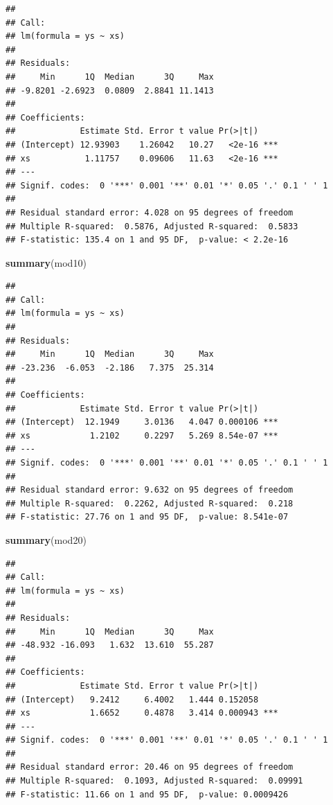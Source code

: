 \documentclass[
]{book}
\newenvironment{Shaded}{\begin{snugshade}}{\end{snugshade}}
\newcommand{\FunctionTok}[1]{\textcolor[rgb]{0.13,0.29,0.53}{\textbf{#1}}}
\newcommand{\NormalTok}[1]{#1}
\begin{document}
\begin{verbatim}
## 
## Call:
## lm(formula = ys ~ xs)
## 
## Residuals:
##     Min      1Q  Median      3Q     Max 
## -9.8201 -2.6923  0.0809  2.8841 11.1413 
## 
## Coefficients:
##             Estimate Std. Error t value Pr(>|t|)    
## (Intercept) 12.93903    1.26042   10.27   <2e-16 ***
## xs           1.11757    0.09606   11.63   <2e-16 ***
## ---
## Signif. codes:  0 '***' 0.001 '**' 0.01 '*' 0.05 '.' 0.1 ' ' 1
## 
## Residual standard error: 4.028 on 95 degrees of freedom
## Multiple R-squared:  0.5876, Adjusted R-squared:  0.5833 
## F-statistic: 135.4 on 1 and 95 DF,  p-value: < 2.2e-16
\end{verbatim}

\begin{Shaded}
\begin{Highlighting}[]
\FunctionTok{summary}\NormalTok{(mod10)}
\end{Highlighting}
\end{Shaded}

\begin{verbatim}
## 
## Call:
## lm(formula = ys ~ xs)
## 
## Residuals:
##     Min      1Q  Median      3Q     Max 
## -23.236  -6.053  -2.186   7.375  25.314 
## 
## Coefficients:
##             Estimate Std. Error t value Pr(>|t|)    
## (Intercept)  12.1949     3.0136   4.047 0.000106 ***
## xs            1.2102     0.2297   5.269 8.54e-07 ***
## ---
## Signif. codes:  0 '***' 0.001 '**' 0.01 '*' 0.05 '.' 0.1 ' ' 1
## 
## Residual standard error: 9.632 on 95 degrees of freedom
## Multiple R-squared:  0.2262, Adjusted R-squared:  0.218 
## F-statistic: 27.76 on 1 and 95 DF,  p-value: 8.541e-07
\end{verbatim}

\begin{Shaded}
\begin{Highlighting}[]
\FunctionTok{summary}\NormalTok{(mod20)}
\end{Highlighting}
\end{Shaded}

\begin{verbatim}
## 
## Call:
## lm(formula = ys ~ xs)
## 
## Residuals:
##     Min      1Q  Median      3Q     Max 
## -48.932 -16.093   1.632  13.610  55.287 
## 
## Coefficients:
##             Estimate Std. Error t value Pr(>|t|)    
## (Intercept)   9.2412     6.4002   1.444 0.152058    
## xs            1.6652     0.4878   3.414 0.000943 ***
## ---
## Signif. codes:  0 '***' 0.001 '**' 0.01 '*' 0.05 '.' 0.1 ' ' 1
## 
## Residual standard error: 20.46 on 95 degrees of freedom
## Multiple R-squared:  0.1093, Adjusted R-squared:  0.09991 
## F-statistic: 11.66 on 1 and 95 DF,  p-value: 0.0009426
\end{verbatim}
\end{document}
